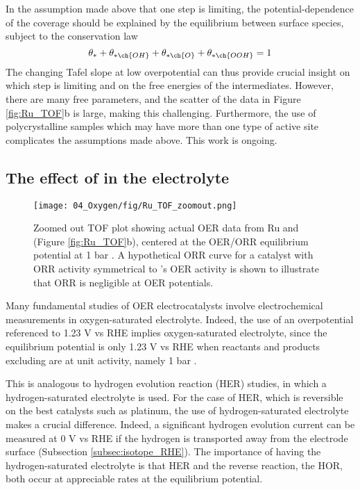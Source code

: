 In the assumption made above that one step is limiting, the potential-dependence of the coverage should be explained by the equilibrium between surface species, subject to the conservation law
\begin{equation}
 \theta_{*} + \theta_{* \ch{OH}} + \theta_{* \ch{O}} + \theta_{* \ch{OOH}} = 1
\end{equation}
The changing Tafel slope at low overpotential can thus provide crucial insight on which step is limiting and on the free energies of the intermediates. However, there are many free parameters, and the scatter of the data in Figure \ref{fig:Ru_TOF}b is large, making this challenging. Furthermore, the use of polycrystalline samples which may have more than one type of active site complicates the assumptions made above. This work is ongoing.


\subsection{The effect of  in the electrolyte}
\begin{figure}[h!]
	\centering
	\texttt{[image: 04\_Oxygen/fig/Ru\_TOF\_zoomout.png]}
	\caption{Zoomed out TOF plot showing actual OER data from Ru and  (Figure \ref{fig:Ru_TOF}b), centered at the OER/ORR equilibrium potential at 1 bar . A hypothetical ORR curve for a catalyst with ORR activity symmetrical to 's OER activity is shown to illustrate that ORR is negligible at OER potentials.}
	\label{fig:Ru_TOF_zoomout}
\end{figure}

Many fundamental studies of OER electrocatalysts involve electrochemical measurements in oxygen-saturated electrolyte. Indeed, the use of an overpotential referenced to 1.23 V vs RHE implies oxygen-saturated electrolyte, since the equilibrium potential is only 1.23 V vs RHE when reactants and products excluding  are at unit activity, namely 1 bar . 



This is analogous to hydrogen evolution reaction (HER) studies, in which a hydrogen-saturated electrolyte is used. For the case of HER, which is reversible on the best catalysts such as platinum, the use of hydrogen-saturated electrolyte makes a crucial difference. Indeed, a significant hydrogen evolution current can be measured at 0 V vs RHE if the hydrogen is transported away from the electrode surface (Subsection \ref{subsec:isotope_RHE}). The importance of having the hydrogen-saturated electrolyte is that HER and the reverse reaction, the HOR, both occur at appreciable rates at the equilibrium potential.

